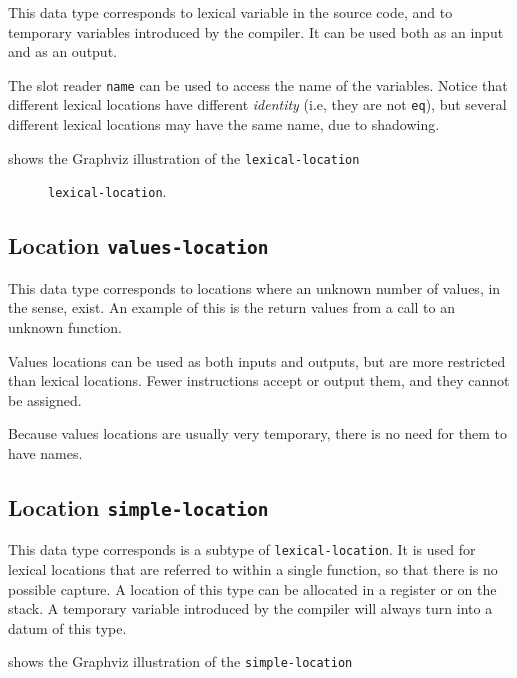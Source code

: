 This data type corresponds to lexical variable in the source code, and
to temporary variables introduced by the compiler.  It can be used
both as an input and as an output.

The slot reader \texttt{name} can be used to access the name of the
variables.  Notice that different lexical locations have different
\emph{identity} (i.e, they are not \texttt{eq}), but several different
lexical locations may have the same name, due to shadowing.

 shows the Graphviz illustration of the
\texttt{lexical-location}

\begin{figure}
\begin{center}
\end{center}
\caption{\label{fig-lexical-location}
\texttt{lexical-location}.}
\end{figure}

\subsection{Location \texttt{values-location}}

This data type corresponds to locations where an unknown number of
values, in the \commonlisp{} sense, exist. An example of this is
the return values from a call to an unknown function.

Values locations can be used as both inputs and outputs, but are
more restricted than lexical locations. Fewer instructions accept or
output them, and they cannot be assigned.

Because values locations are usually very temporary, there is no
need for them to have names.


\subsection{Location \texttt{simple-location}}

This data type corresponds is a subtype of \texttt{lexical-location}.
It is used for lexical locations that are referred to within a single
function, so that there is no possible capture.  A location of this
type can be allocated in a register or on the stack.  A temporary
variable introduced by the compiler will always turn into a datum of
this type.

 shows the Graphviz illustration of the
\texttt{simple-location}

